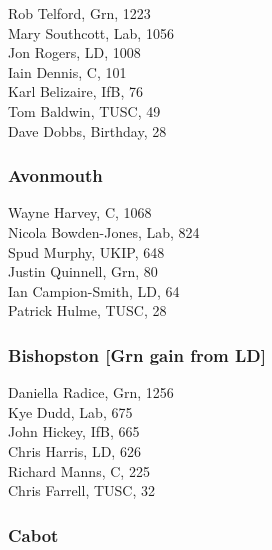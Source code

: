 \documentclass[a4paper,openany,10pt]{book}
\begin{document}


Rob Telford, Grn, 1223\\
Mary Southcott, Lab, 1056\\
Jon Rogers, LD, 1008\\
Iain Dennis, C, 101\\
Karl Belizaire, IfB, 76\\
Tom Baldwin, TUSC, 49\\
Dave Dobbs, Birthday, 28\\


\subsubsection*{Avonmouth}



Wayne Harvey, C, 1068\\
Nicola Bowden-Jones, Lab, 824\\
Spud Murphy, UKIP, 648\\
Justin Quinnell, Grn, 80\\
Ian Campion-Smith, LD, 64\\
Patrick Hulme, TUSC, 28\\


\subsubsection*{Bishopston \hspace*{\fill}\nolinebreak[1]%
\enspace\hspace*{\fill}
[Grn gain from LD]}



Daniella Radice, Grn, 1256\\
Kye Dudd, Lab, 675\\
John Hickey, IfB, 665\\
Chris Harris, LD, 626\\
Richard Manns, C, 225\\
Chris Farrell, TUSC, 32\\


\subsubsection*{Cabot}

\end{document}
